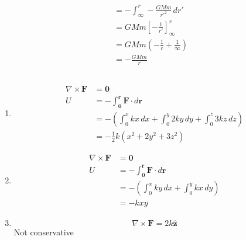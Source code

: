 \documentclass{article}
\renewcommand{\vec}[1]{\boldsymbol{\mathbf{#1}}}
\newcommand{\uvec}[1]{\hat{\vec{#1}}}
\begin{document}
\begin{align*}
                        & = -\int_\infty^r -\frac{G M m}{r'^2} \,d r'                                                                                                                        \\
                        & = G M m \left[ -\frac{1}{r'} \right]_\infty^r                                                                                                                      \\
                        & = G M m \left( -\frac{1}{r} + \frac{1}{\infty} \right)                                                                                                             \\
                        & = -\frac{G M m}{r}
\end{align*}

\setcounter{subsection}{22}
\subsection{}

\begin{enumerate}
  \item

        \begin{align*}
          \nabla \times \vec{F} & = \vec{0}                                                                          \\
          U                     & = -\int_{\vec{0}}^{\vec{r}} \vec{F} \cdot d \vec{r}                                \\
                                & = -\left( \int_0^x k x \,d x + \int_0^y 2 k y \,d y + \int_0^z 3 k z \,d z \right) \\
                                & = -\frac{1}{2} k (x^2 + 2 y^2 + 3 z^2)
        \end{align*}

  \item

        \begin{align*}
          \nabla \times \vec{F} & = \vec{0}                                                 \\
          U                     & = -\int_{\vec{0}}^{\vec{r}} \vec{F} \cdot d \vec{r}       \\
                                & = -\left( \int_0^x k y \,d x + \int_0^y k x \,d y \right) \\
                                & = -k x y
        \end{align*}

  \item \[\nabla \times \vec{F} = 2 k \uvec{z}\] Not conservative
\end{enumerate}
\end{document}
